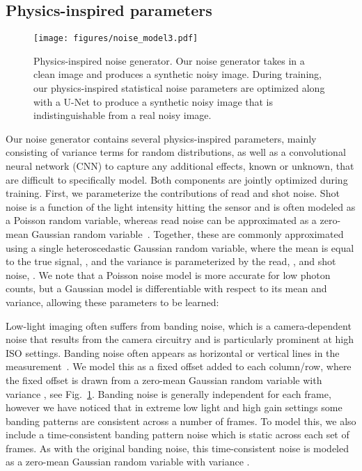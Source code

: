 \documentclass[final]{cvpr}
\begin{document}
\subsection{Physics-inspired parameters}

\begin{figure}[thb]
\centering
\texttt{[image: figures/noise\_model3.pdf]}
   \caption{Physics-inspired noise generator. Our noise generator takes in a clean image and produces a synthetic noisy image. During training, our physics-inspired statistical noise parameters are optimized along with a U-Net to produce a synthetic noisy image that is indistinguishable from a real noisy image.}
\label{fig:noise_model}
\vspace{-3mm}
\end{figure}

Our noise generator contains several physics-inspired parameters, mainly consisting of variance terms for random distributions, as well as a convolutional neural network (CNN) to capture any additional effects, known or unknown, that are difficult to specifically model. Both components are jointly optimized during training. First, we parameterize the contributions of read and shot noise. Shot noise is a function of the light intensity hitting the sensor and is often modeled as a Poisson random variable, whereas read noise can be approximated as a zero-mean Gaussian random variable~\cite{foi2008practical, foi2009clipped}. Together, these are commonly approximated using a single heteroscedastic Gaussian random variable, where the mean is equal to the true signal, , and the variance is parameterized by the read, , and shot noise, . We note that a Poisson noise model is more accurate for low photon counts, but a Gaussian model is differentiable with respect to its mean and variance, allowing these parameters to be learned:


Low-light imaging often suffers from banding noise, which is a camera-dependent noise that results from the camera circuitry and is particularly prominent at high ISO settings. Banding noise often appears as horizontal or vertical lines in the measurement~\cite{konnik2014high, boukhayma2018low}. We model this as a fixed offset added to each column/row, where the fixed offset is drawn from a zero-mean Gaussian random variable with variance , see Fig.~\ref{fig:noise_model}. 
Banding noise is generally independent for each frame, however we have noticed that in extreme low light and high gain settings some banding patterns are consistent across a number of frames. To model this, we also include a time-consistent banding pattern noise which is static across each set of frames. As with the original banding noise, this time-consistent noise is modeled as a zero-mean Gaussian random variable with variance . 
\end{document}
